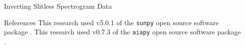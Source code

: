 \documentclass[final]{beamer}
\newlength{\sepwidth}
\newlength{\colwidth}
\newcommand{\separatorcolumn}{\begin{column}{\sepwidth}\end{column}}
\begin{document}
\begin{frame}[t]
\begin{columns}[t]
\begin{column}{\colwidth}
\begin{block}{Inverting Slitless Spectrogram Data}
  \end{block}

  \vspace{-30px}

  \begin{block}{References}
    \tiny
    This research used v5.0.1 of the \texttt{sunpy} open source software package \citep{the_sunpy_community_sunpy_2020}.
    This research used v0.7.3 of the \texttt{aiapy} open source software package \citep{barnes_aiapy_2020}.
    \begin{multicols}{2}
      
      
    \end{multicols}
  \end{block}

\end{column}

\separatorcolumn
\end{columns}
\end{frame}
\end{document}
